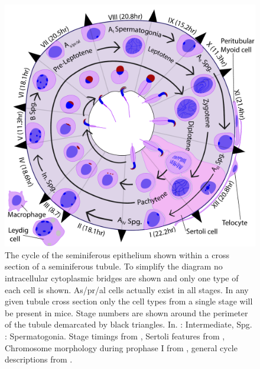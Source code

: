 \begin{figure}[H]
	\centering
	\includegraphics[width=\textwidth]{figures/intro/testis_cycle_anatomy.pdf}
	\caption[Testis Anatomy]{The cycle of the seminiferous epithelium shown within a cross section of a seminiferous tubule.
To simplify the diagram no intracellular cytoplasmic bridges are shown and only one type of each cell is shown.
As/pr/al cells actually exist in all stages.
In any given tubule cross section only the cell types from a single stage will be present in mice.
Stage numbers are shown around the perimeter of the tubule demarcated by black triangles.
In. : Intermediate, Spg. : Spermatogonia.
Stage timings from \cite{Oakberg1956Duration}, Sertoli features from \cite{Hess2015Sertoli}, Chromosome morphology during prophase I from \cite{Link2019Meiotic}, general cycle descriptions from \cite{Monesi1978Chapter, Ahmed2009Staging, Meistrich2013Assessment, Oakberg1956description, Hess2008Spermatogenesis, Nakata2015Quantitative, Muciaccia2013Novel, Osuru2014acrosomal, Lara2018Testis, Junqueira2005Basic}.}
	\label{fig:histology}
\end{figure}

